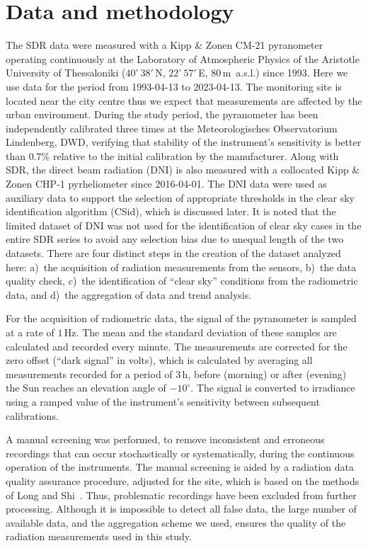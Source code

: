 \documentclass[applsci,article,submit,moreauthors,pdftex]{Definitions/mdpi}
\begin{document}
\hypertarget{data-and-methodology}{%
\section{Data and methodology}\label{data-and-methodology}}

The SDR data were measured with a Kipp \& Zonen CM-21 pyranometer
operating continuously at the Laboratory of Atmospheric Physics of the
Aristotle University of Thessaloniki (\(40^\circ\,38'\,\)N,
\(22^\circ\,57'\,\)E, \(80\,\)m~a.s.l.) since 1993. Here we use data for
the period from 1993-04-13 to 2023-04-13. The monitoring site is located
near the city centre thus we expect that measurements are affected by
the urban environment. During the study period, the pyranometer has been
independently calibrated three times at the Meteorologisches
Observatorium Lindenberg, DWD, verifying that stability of the
instrument's sensitivity is better than \(0.7\%\) relative to the
initial calibration by the manufacturer. Along with SDR, the direct beam
radiation (DNI) is also measured with a collocated Kipp \& Zonen CHP-1
pyrheliometer since 2016-04-01. The DNI data were used as auxiliary data
to support the selection of appropriate thresholds in the clear sky
identification algorithm (CSid), which is discussed later. It is noted
that the limited dataset of DNI was not used for the identification of
clear sky cases in the entire SDR series to avoid any selection bias due
to unequal length of the two datasets. There are four distinct steps in
the creation of the dataset analyzed here: a)~the acquisition of
radiation measurements from the sensors, b)~the data quality check,
c)~the identification of ``clear sky'' conditions from the radiometric
data, and d)~the aggregation of data and trend analysis.

For the acquisition of radiometric data, the signal of the pyranometer
is sampled at a rate of \(1\,\text{Hz}\). The mean and the standard
deviation of these samples are calculated and recorded every minute. The
measurements are corrected for the zero offset (``dark signal'' in
volts), which is calculated by averaging all measurements recorded for a
period of \(3\,\text{h}\), before (morning) or after (evening) the Sun
reaches an elevation angle of \(-10^\circ\). The signal is converted to
irradiance using a ramped value of the instrument's sensitivity between
subsequent calibrations.

A manual screening was performed, to remove inconsistent and erroneous
recordings that can occur stochastically or systematically, during the
continuous operation of the instruments. The manual screening is aided
by a radiation data quality assurance procedure, adjusted for the site,
which is based on the methods of Long and
Shi~\citep{Long2006, Long2008a}. Thus, problematic recordings have been
excluded from further processing. Although it is impossible to detect
all false data, the large number of available data, and the aggregation
scheme we used, ensures the quality of the radiation measurements used
in this study.
\end{document}
